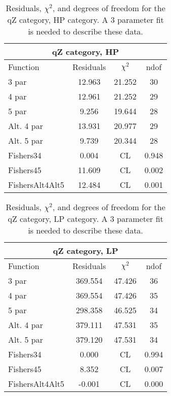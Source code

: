 \begin{table}[htb]
\centering
\begin{tabular}{|l c c c |}
\hline
\multicolumn{4}{|c|}{qZ category, HP}\\
\hline
Function & Residuals & $\chi^2$ & ndof \\
\hline
3 par & 12.963 & 21.252 & 30 \\
4 par & 12.961 & 21.252 & 29 \\
5 par & 9.256 & 19.644 & 28 \\
Alt. 4 par& 13.931 & 20.977 & 29 \\
Alt. 5 par& 9.739 & 20.344 & 28 \\
\hline
\hline
Fishers34  & 0.004 & CL & 0.948\\
Fishers45  & 11.609 & CL & 0.002\\
FishersAlt4Alt5  & 12.484 & CL & 0.001\\
\hline
\end{tabular}
\caption{Residuals, $\chi^{2}$, and degrees of freedom for the qZ category, HP category. A 3 parameter fit is needed to describe these data.}
\label{tab:qZ category, HP}
\end{table}
\begin{table}[htb]
\centering
\begin{tabular}{|l c c c |}
\hline
\multicolumn{4}{|c|}{qZ category, LP}\\
\hline
Function & Residuals & $\chi^2$ & ndof \\
\hline
3 par & 369.554 & 47.426 & 36 \\
4 par & 369.554 & 47.426 & 35 \\
5 par & 298.358 & 46.525 & 34 \\
Alt. 4 par& 379.111 & 47.531 & 35 \\
Alt. 5 par& 379.120 & 47.531 & 34 \\
\hline
\hline
Fishers34  & 0.000 & CL & 0.994\\
Fishers45  & 8.352 & CL & 0.007\\
FishersAlt4Alt5  & -0.001 & CL & 0.000\\
\hline
\end{tabular}
\caption{Residuals, $\chi^{2}$, and degrees of freedom for the qZ category, LP category. A 3 parameter fit is needed to describe these data.}
\label{tab:qZ category, LP}
\end{table}
